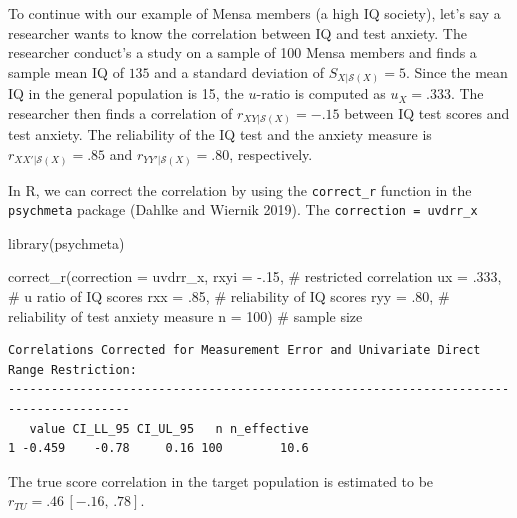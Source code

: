 \documentclass[
  letterpaper,
  DIV=11,
  numbers=noendperiod]{scrreprt}
\newenvironment{Shaded}{}{}
\newcommand{\AttributeTok}[1]{\textcolor[rgb]{0.00,0.34,0.68}{#1}}
\newcommand{\CommentTok}[1]{\textcolor[rgb]{0.54,0.53,0.53}{#1}}
\newcommand{\DecValTok}[1]{\textcolor[rgb]{0.69,0.50,0.00}{#1}}
\newcommand{\FunctionTok}[1]{\textcolor[rgb]{0.39,0.29,0.61}{#1}}
\newcommand{\NormalTok}[1]{\textcolor[rgb]{0.12,0.11,0.11}{#1}}
\newcommand{\SpecialCharTok}[1]{\textcolor[rgb]{0.24,0.68,0.91}{#1}}
\newcommand{\StringTok}[1]{\textcolor[rgb]{0.75,0.01,0.01}{#1}}
\begin{document}
\begin{tcolorbox}[enhanced jigsaw, toptitle=1mm, titlerule=0mm, arc=.35mm, breakable, colframe=quarto-callout-note-color-frame, title={Applied Example in R}, opacitybacktitle=0.6, opacityback=0, colbacktitle=quarto-callout-note-color!10!white, coltitle=black, bottomtitle=1mm, colback=white, bottomrule=.15mm, rightrule=.15mm, toprule=.15mm, leftrule=.75mm, left=2mm]

To continue with our example of Mensa members (a high IQ society), let's
say a researcher wants to know the correlation between IQ and test
anxiety. The researcher conduct's a study on a sample of 100 Mensa
members and finds a sample mean IQ of \(135\) and a standard deviation
of \(S_{X|\mathcal{S}(X)}=5\). Since the mean IQ in the general
population is 15, the \(u\)-ratio is computed as \(u_X=.333\). The
researcher then finds a correlation of \(r_{XY|\mathcal{S}(X)}=-.15\)
between IQ test scores and test anxiety. The reliability of the IQ test
and the anxiety measure is \(r_{XX'|\mathcal{S}(X)}=.85\) and
\(r_{YY'|\mathcal{S}(X)}=.80\), respectively.

In R, we can correct the correlation by using the \texttt{correct\_r}
function in the \texttt{psychmeta} package (Dahlke and Wiernik 2019).
The \texttt{correction\ =\ \textquotesingle{}uvdrr\_x\textquotesingle{}}

\begin{Shaded}
\begin{Highlighting}[]
\FunctionTok{library}\NormalTok{(psychmeta)}

\FunctionTok{correct\_r}\NormalTok{(}\AttributeTok{correction =} \StringTok{\textquotesingle{}uvdrr\_x\textquotesingle{}}\NormalTok{,}
          \AttributeTok{rxyi =} \SpecialCharTok{{-}}\NormalTok{.}\DecValTok{15}\NormalTok{,  }\CommentTok{\# restricted correlation}
          \AttributeTok{ux =}\NormalTok{ .}\DecValTok{333}\NormalTok{,   }\CommentTok{\# u ratio of IQ scores}
          \AttributeTok{rxx =}\NormalTok{ .}\DecValTok{85}\NormalTok{,   }\CommentTok{\# reliability of IQ scores}
          \AttributeTok{ryy =}\NormalTok{ .}\DecValTok{80}\NormalTok{,   }\CommentTok{\# reliability of test anxiety measure}
          \AttributeTok{n =} \DecValTok{100}\NormalTok{)    }\CommentTok{\# sample size}
\end{Highlighting}
\end{Shaded}

\begin{verbatim}
Correlations Corrected for Measurement Error and Univariate Direct Range Restriction:
---------------------------------------------------------------------------------------
   value CI_LL_95 CI_UL_95   n n_effective
1 -0.459    -0.78     0.16 100        10.6
\end{verbatim}

The true score correlation in the target population is estimated to be
\(r_{TU} = .46\, [-.16,\, .78]\).

\end{tcolorbox}
\end{document}
